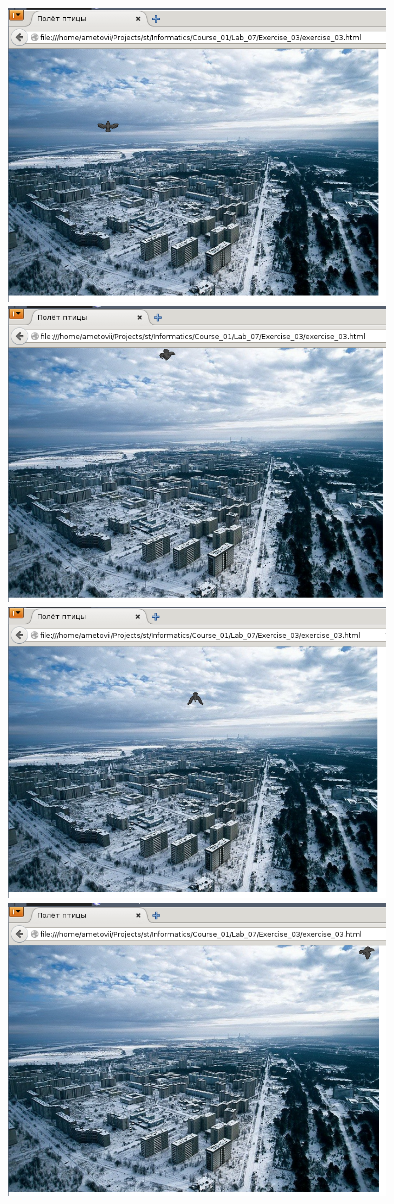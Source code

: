 \begin{center}
  \includegraphics[width=10cm]{img/Exercise_03/04.png}
  \includegraphics[width=10cm]{img/Exercise_03/05.png}
  \includegraphics[width=10cm]{img/Exercise_03/06.png}
  \includegraphics[width=10cm]{img/Exercise_03/07.png}
\end{center}


